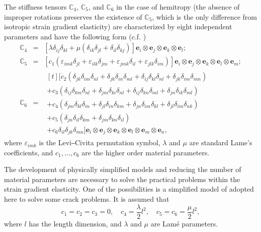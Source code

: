 The stiffness tensors ${{\mathbb C}}_4$, ${{\mathbb C}}_5$, and ${{\mathbb C}}_6$ in the case of hemitropy (the absence of improper rotations preserves the existence of ${{\mathbb C}}_5$, which is the only difference from isotropic strain gradient elasticity) are characterized by eight independent parameters and have the following form (c.f. \cite{Chirkov2, Chirkov44, Chirkov45})
\begin{equation} \label{Chirkov_Eq_8_} 
	\begin{array}{rcl}
		{\mathbb C}_4 &=&\left[\lambda\delta_{ij}\delta_{kl}+\mu\left(\delta_{ik}\delta_{jl}+\delta_{il}\delta_{kj}\right)\right]{{\mathbf e}}_i\otimes {{\mathbf e}}_j\otimes {{\mathbf e}}_k\otimes {{\mathbf e}}_l;
		\\
		{\mathbb C}_5 &=&\left[c_1\left(\varepsilon_{imk}\delta_{jl}+\varepsilon_{ilk}\delta_{jm}+\varepsilon_{jmk}\delta_{il}+\varepsilon_{jlk}\delta_{im}\right)\right]{{\mathbf e}}_i\otimes {{\mathbf e}}_j\otimes {{\mathbf e}}_k\otimes {{\mathbf e}}_l\otimes {{\mathbf e}}_m;
		\\
		{\mathbb C}_6 &=&
		\begin{multlined}[t] \big[c_2(\delta_{jk}\delta_{im}\delta_{nl}+\delta_{jk}\delta_{in}\delta_{ml}+\delta_{ij}\delta_{kl}\delta_{nl}+\delta_{jk}\delta_{im}\delta_{mn})
			\\[-1em]
			+c_3\left(\delta_{ij}\delta_{km}\delta_{nl}+\delta_{jm}\delta_{ki}\delta_{nl}+\delta_{ij}\delta_{kn}\delta_{ml}+\delta_{jn}\delta_{ik}\delta_{ml}\right) 
			\\
			+c_4(\delta_{jm}\delta_{kl}\delta_{in}+\delta_{jl}\delta_{in}\delta_{km}+\delta_{jn}\delta_{im}\delta_{kl}+\delta_{jl}\delta_{im}\delta_{nk})
			\\
			+c_5(\delta_{jn}\delta_{il}\delta_{km}+\delta_{jm}\delta_{kn}\delta_{il})
			\\
			+c_6\delta_{il}\delta_{jk}\delta_{mn}\big]{{\mathbf e}}_i\otimes {{\mathbf e}}_j\otimes {{\mathbf e}}_k\otimes {{\mathbf e}}_l\otimes {{\mathbf e}}_m\otimes {{\mathbf e}}_n,
		\end{multlined}
	\end{array}
\end{equation} 
where $\varepsilon_{imk}$ is the Levi‒Civita permutation symbol, $\lambda$ and $\mu$ are standard Lame's coefficients, and $c_1,\dots ,c_6$ are the higher order material parameters.

The development of physically simplified models and reducing the number of material parameters are necessary to solve the practical problems within the strain gradient elasticity. One of the possibilities is a simplified model of \cite{Chirkov4, Chirkov13} adopted here to solve some crack problems. It is assumed that
\begin{equation} \label{Chirkov_Eq_9_} 
	c_1=c_2=c_3=0,\quad c_4=\frac{\lambda}{2}l^2,\quad c_5= c_6=\frac{\mu}{2}l^2,                          
\end{equation} 
where $l$ has the length dimension, and $\lambda$ and $\mu$ are Lamé parameters.

